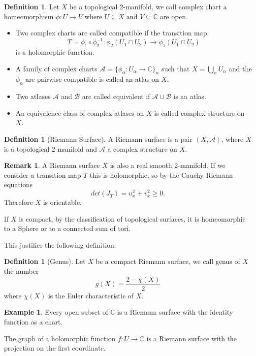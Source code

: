 \documentclass[12pt,a4paper,openright,twoside]{report}
\theoremstyle{definition} %
\newtheorem{definition}[theorem]{Definition}
\newtheorem{remark}[theorem]{Remark}
\newtheorem{example}[theorem]{Example}
\def \C {\mathbb{C}}
\def \A {\mathcal{A}}
\begin{document}
\begin{definition}
    Let \(X\) be a topological 2-manifold, we call complex chart a homeomorphism \( \phi : U \to V\)
    where \(U \subseteq X\) and \(V \subseteq \C\) are open.
    \begin{itemize}
    \item Two complex charts are called compatible if the transition map
    \[
        T = \phi_1 \circ \phi_2^{-1} : \phi_2(U_1 \cap U_2) \to \phi_1(U_1 \cap U_2)
    \]
    is a holomorphic function.
    \item A family of complex charts \( \A = \{\phi_{\alpha} : U_{\alpha} \to \C \}_{\alpha} \) such that
    \( X = \bigcup_{\alpha} U_{\alpha}\) and the \(\phi_{\alpha}\) are pairwise compatible is called an atlas on \(X\).
    \item Two atlases \(\A\) and \( \mathcal{B}\) are called equivalent if \( \A \cup \mathcal{B}\) is an atlas.
    \item An equivalence class of complex atlases on \(X\) is called complex structure on \(X\).
    \end{itemize}
    
\end{definition}

\begin{definition}[Riemann Surface]
    A Riemann surface is a pair \((X,\A)\), where \(X\) is a topological 2-manifold and \(\A\) a complex structure on \(X\).
\end{definition}

\begin{remark}
    A Riemann surface \(X\) is also a real smooth 2-manifold. If we consider a transition map \(T\) this is holomorphic, so by the Cauchy-Riemann equations
    \[
        det(J_T) = u_x^2 + v_x^2 \geq 0.
    \]
    Therefore \(X\) is orientable.
    
    If \(X\) is compact, by the classification of topological surfaces, it is homeomorphic to a Sphere or to a connected sum of tori.
\end{remark}

 This justifies the following definition:

\begin{definition}[Genus]
    Let \(X\) be a compact Riemann surface, we call genus of \(X\) the number
    \[
        g(X)=\frac{2-\chi(X)}{2}   
    \]
    where \(\chi(X)\) is the Euler characteristic of \(X\).
\end{definition}

\begin{example}
    Every open subset of \(\C\) is a Riemann surface with the identity function as a chart.
    
    The graph of a holomorphic function \( f : U \to \C\) is a Riemann surface with the projection on the first coordinate.
\end{example}
\end{document}
